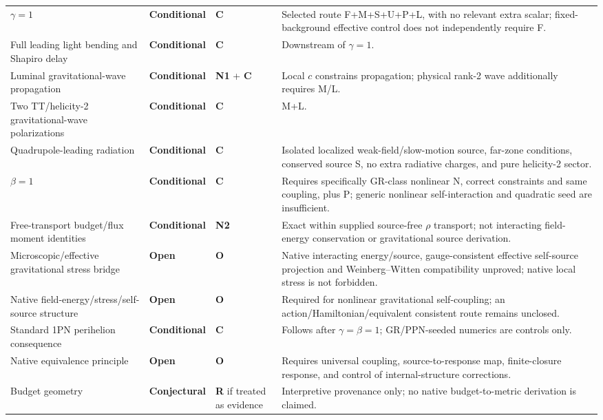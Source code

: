 \documentclass[11pt]{article}
\newcommand{\statusConditional}{\textcolor{yellow!60!black}{\textbf{Conditional}}}
\newcommand{\statusOpen}{\textcolor{red!75!black}{\textbf{Open}}}
\newcommand{\statusConjectural}{\textcolor{magenta!65!black}{\textbf{Conjectural}}}
\newcommand{\NOne}{\textbf{N1}}
\newcommand{\NTwo}{\textbf{N2}}
\newcommand{\Control}{\textbf{C}}
\newcommand{\OpenBridge}{\textbf{O}}
\newcommand{\RenameRisk}{\textbf{R}}
\theoremstyle{plain}
\theoremstyle{remark}
\begin{document}
{\begin{longtable}{@{}P{3.8cm}P{2.8cm}P{1.5cm}P{5.3cm}@{}}
$\gamma=1$ & \statusConditional{} & \Control{} & Selected route F+M+S+U+P+L, with no relevant extra scalar; fixed-background effective control does not independently require F. \\
Full leading light bending and Shapiro delay & \statusConditional{} & \Control{} & Downstream of $\gamma=1$. \\
Luminal gravitational-wave propagation & \statusConditional{} & \NOne{} + \Control{} & Local $c$ constrains propagation; physical rank-2 wave additionally requires M/L. \\
Two TT/helicity-2 gravitational-wave polarizations & \statusConditional{} & \Control{} & M+L. \\
Quadrupole-leading radiation & \statusConditional{} & \Control{} & Isolated localized weak-field/slow-motion source, far-zone conditions, conserved source S, no extra radiative charges, and pure helicity-2 sector. \\
$\beta=1$ & \statusConditional{} & \Control{} & Requires specifically GR-class nonlinear N, correct constraints and same coupling, plus P; generic nonlinear self-interaction and quadratic seed are insufficient. \\
Free-transport budget/flux moment identities & \statusConditional{} & \NTwo{} & Exact within supplied source-free $\rho$ transport; not interacting field-energy conservation or gravitational source derivation. \\
Microscopic/effective gravitational stress bridge & \statusOpen{} & \OpenBridge{} & Native interacting energy/source, gauge-consistent effective self-source projection and Weinberg--Witten compatibility unproved; native local stress is not forbidden. \\
Native field-energy/stress/self-source structure & \statusOpen{} & \OpenBridge{} & Required for nonlinear gravitational self-coupling; an action/Hamiltonian/equivalent consistent route remains unclosed. \\
Standard 1PN perihelion consequence & \statusConditional{} & \Control{} & Follows after $\gamma=\beta=1$; GR/PPN-seeded numerics are controls only. \\
Native equivalence principle & \statusOpen{} & \OpenBridge{} & Requires universal coupling, source-to-response map, finite-closure response, and control of internal-structure corrections. \\
Budget geometry & \statusConjectural{} & \RenameRisk{} if treated as evidence & Interpretive provenance only; no native budget-to-metric derivation is claimed. \\

\end{longtable}}
\end{document}
